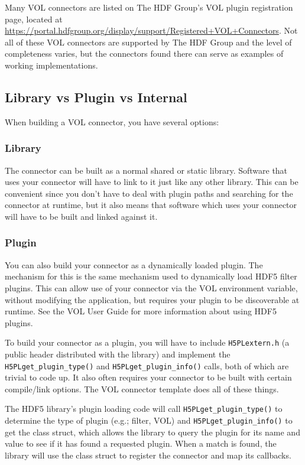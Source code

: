 Many VOL connectors are listed on The HDF Group's VOL plugin registration page,
located at \url{https://portal.hdfgroup.org/display/support/Registered+VOL+Connectors}.
Not all of these VOL connectors are supported by The HDF Group and the level
of completeness varies, but the connectors found there can serve as examples
of working implementations.

\subsection{Library vs Plugin vs Internal}

When building a VOL connector, you have several options:

\subsubsection*{Library}

The connector can be built as a normal shared or static library. Software that
uses your connector will have to link to it just like any other library. This
can be convenient since you don't have to deal with plugin paths and searching
for the connector at runtime, but it also means that software which uses
your connector will have to be built and linked against it.

\subsubsection*{Plugin}

You can also build your connector as a dynamically loaded plugin. The mechanism
for this is the same mechanism used to dynamically load HDF5 filter plugins. This can
allow use of your connector via the VOL environment variable, without modifying
the application, but requires your plugin to be discoverable at runtime. See
the VOL User Guide for more information about using HDF5 plugins.

To build your connector as a plugin, you will have to include {\tt H5PLextern.h}
(a public header distributed with the library) and implement the
{\tt H5PLget\_plugin\_type()} and {\tt H5PLget\_plugin\_info()}
calls, both of which are trivial to code up. It also often requires your
connector to be built with certain compile/link options. The VOL connector
template does all of these things.

The HDF5 library's plugin loading code will call {\tt H5PLget\_plugin\_type()}
to determine the type of plugin (e.g.; filter, VOL) and {\tt H5PLget\_plugin\_info()}
to get the class struct, which allows the library to query the plugin for its
name and value to see if it has found a requested plugin. When a match is found,
the library will use the class struct to register the connector and map its callbacks.

